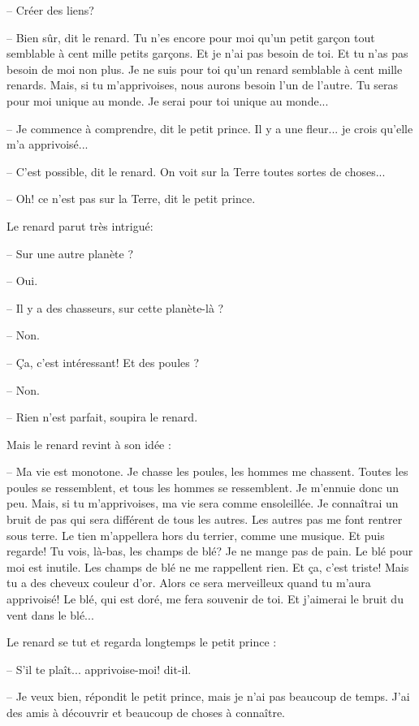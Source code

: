 \documentclass[a4paper]{report}
\begin{document}
-- Créer des liens?

-- Bien sûr, dit le renard. Tu n'es encore pour moi qu'un petit garçon tout semblable à cent mille petits garçons. Et je n'ai pas besoin de toi. Et tu n'as pas besoin de moi non plus. Je ne suis pour toi qu'un renard semblable à cent mille renards. Mais, si tu m'apprivoises, nous aurons besoin l'un de l'autre. Tu seras pour moi unique au monde. Je serai pour toi unique au monde...

-- Je commence à comprendre, dit le petit prince. Il y a une fleur... je crois qu'elle m'a apprivoisé...

-- C'est possible, dit le renard. On voit sur la Terre toutes sortes de choses...

-- Oh! ce n'est pas sur la Terre, dit le petit prince.

Le renard parut très intrigué:

-- Sur une autre planète ?

-- Oui.

-- Il y a des chasseurs, sur cette planète-là ?

-- Non.

-- Ça, c'est intéressant! Et des poules ?

-- Non.

-- Rien n'est parfait, soupira le renard.

Mais le renard revint à son idée :

-- Ma vie est monotone. Je chasse les poules, les hommes me chassent. Toutes les poules se ressemblent, et tous les hommes se ressemblent. Je m'ennuie donc un peu. Mais, si tu m'apprivoises, ma vie sera comme ensoleillée. Je connaîtrai un bruit de pas qui sera différent de tous les autres. Les autres pas me font rentrer sous terre. Le tien m'appellera hors du terrier, comme une musique. Et puis regarde! Tu vois, là-bas, les champs de blé? Je ne mange pas de pain. Le blé pour moi est inutile. Les champs de blé ne me rappellent rien. Et ça, c'est triste! Mais tu a des cheveux couleur d'or. Alors ce sera merveilleux quand tu m'aura apprivoisé! Le blé, qui est doré, me fera souvenir de toi. Et j'aimerai le bruit du vent dans le blé...

Le renard se tut et regarda longtemps le petit prince :

-- S'il te plaît... apprivoise-moi! dit-il.

-- Je veux bien, répondit le petit prince, mais je n'ai pas beaucoup de temps. J'ai des amis à découvrir et beaucoup de choses à connaître.
\end{document}
